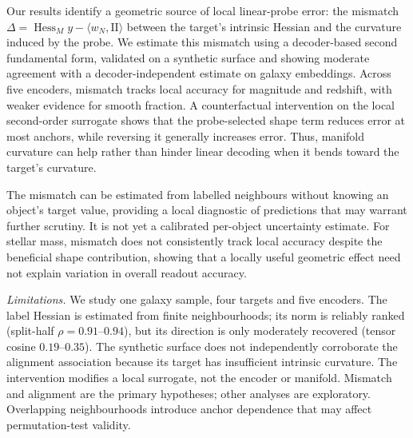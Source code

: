 \documentclass{article}
\begin{document}
Our results identify a geometric source of local linear-probe error: the mismatch $\Delta=\operatorname{Hess}_M y-\langle w_N,\mathrm{II}\rangle$ between the target's intrinsic Hessian and the curvature induced by the probe. We estimate this mismatch using a decoder-based second fundamental form, validated on a synthetic surface and showing moderate agreement with a decoder-independent estimate on galaxy embeddings. Across five encoders, mismatch tracks local accuracy for magnitude and redshift, with weaker evidence for smooth fraction. A counterfactual intervention on the local second-order surrogate shows that the probe-selected shape term reduces error at most anchors, while reversing it generally increases error. Thus, manifold curvature can help rather than hinder linear decoding when it bends toward the target's curvature.

The mismatch can be estimated from labelled neighbours without knowing an object's target value, providing a local diagnostic of predictions that may warrant further scrutiny. It is not yet a calibrated per-object uncertainty estimate. For stellar mass, mismatch does not consistently track local accuracy despite the beneficial shape contribution, showing that a locally useful geometric effect need not explain variation in overall readout accuracy.

\emph{Limitations.}
We study one galaxy sample, four targets and five encoders. The label Hessian is estimated from finite neighbourhoods; its norm is reliably ranked (split-half $\rho=0.91$--$0.94$), but its direction is only moderately recovered (tensor cosine $0.19$--$0.35$). The synthetic surface does not independently corroborate the alignment association because its target has insufficient intrinsic curvature. The intervention modifies a local surrogate, not the encoder or manifold. Mismatch and alignment are the primary hypotheses; other analyses are exploratory. Overlapping neighbourhoods introduce anchor dependence that may affect permutation-test validity.


{\small

}

\appendix
\end{document}
